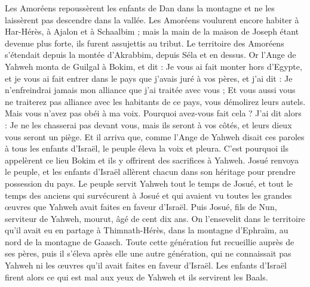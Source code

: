 \begin{multicols}{2}
Les Amoréens repoussèrent les enfants de Dan dans la montagne et ne les laissèrent pas descendre dans la vallée.
Les Amoréens voulurent encore habiter à Har-Hérès, à Ajalon et à Schaalbim ; mais la main de la maison de Joseph étant devenue plus forte, ils furent assujettis au tribut.
Le territoire des Amoréens s'étendait depuis la montée d'Akrabbim, depuis Séla et en dessus.
\VerseOne{}Or l'Ange de Yahweh monta de Guilgal à Bokim, et dit : Je vous ai fait monter hors d'Egypte, et je vous ai fait entrer dans le pays que j'avais juré à vos pères, et j'ai dit : Je n'enfreindrai jamais mon alliance que j'ai traitée avec vous ;
Et vous aussi vous ne traiterez pas alliance avec les habitants de ce pays, vous démolirez leurs autels. Mais vous n'avez pas obéi à ma voix. Pourquoi avez-vous fait cela ?
J'ai dit alors : Je ne les chasserai pas devant vous, mais ils seront à vos côtés, et leurs dieux vous seront un piège.
Et il arriva que, comme l'Ange de Yahweh disait ces paroles à tous les enfants d'Israël, le peuple éleva la voix et pleura.
C'est pourquoi ils appelèrent ce lieu Bokim et ils y offrirent des sacrifices à Yahweh.
Josué renvoya le peuple, et les enfants d'Israël allèrent chacun dans son héritage pour prendre possession du pays.
Le peuple servit Yahweh tout le temps de Josué, et tout le temps des anciens qui survécurent à Josué et qui avaient vu toutes les grandes œuvres que Yahweh avait faites en faveur d'Israël.
Puis Josué, fils de Nun, serviteur de Yahweh, mourut, âgé de cent dix ans.
On l'ensevelit dans le territoire qu'il avait eu en partage à Thimnath-Hérès, dans la montagne d'Ephraïm, au nord de la montagne de Gaasch.
Toute cette génération fut recueillie auprès de ses pères, puis il s'éleva après elle une autre génération, qui ne connaissait pas Yahweh ni les œuvres qu'il avait faites en faveur d'Israël.
Les enfants d'Israël firent alors ce qui est mal aux yeux de Yahweh et ils servirent les Baals.

\end{multicols}
